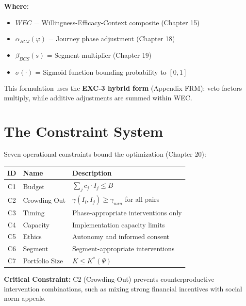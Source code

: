 \textbf{Where:}
\begin{itemize}
    \item $WEC$ = Willingness-Efficacy-Context composite (Chapter 15)
    \item $\alpha_{BCJ}(\varphi)$ = Journey phase adjustment (Chapter 18)
    \item $\beta_{BCS}(s)$ = Segment multiplier (Chapter 19)
    \item $\sigma(\cdot)$ = Sigmoid function bounding probability to $[0,1]$
\end{itemize}

This formulation uses the \textbf{EXC-3 hybrid form} (Appendix FRM): veto factors multiply, while additive adjustments are summed within WEC.


\section{The Constraint System}
\label{sec:25-constraints}

Seven operational constraints bound the optimization (Chapter 20):

\begin{tcolorbox}[colback=orange!5!white,colframe=orange!75!black,
    title=\textbf{Operational Constraints C1--C7}]
\begin{tabular}{|c|l|p{7cm}|}
\hline
\textbf{ID} & \textbf{Name} & \textbf{Description} \\
\hline
C1 & Budget & $\sum_j c_j \cdot I_j \leq B$ \\
C2 & Crowding-Out & $\gamma(I_i, I_j) \geq \gamma_{min}$ for all pairs \\
C3 & Timing & Phase-appropriate interventions only \\
C4 & Capacity & Implementation capacity limits \\
C5 & Ethics & Autonomy and informed consent \\
C6 & Segment & Segment-appropriate interventions \\
C7 & Portfolio Size & $K \leq K^*(\Psi)$ \\
\hline
\end{tabular}
\end{tcolorbox}

\textbf{Critical Constraint:} C2 (Crowding-Out) prevents counterproductive intervention combinations, such as mixing strong financial incentives with social norm appeals.


